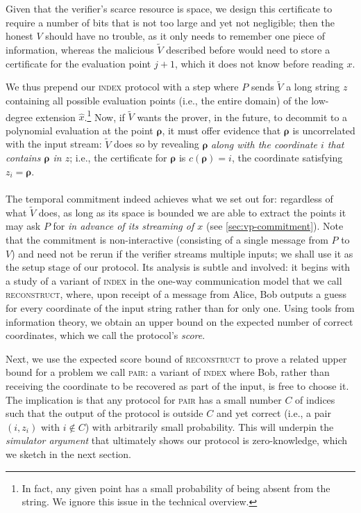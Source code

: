 \documentclass[a4paper,UKenglish,cleveref, autoref, thm-restate]{lipics-v2021}
\theoremstyle{definition}
\newcommand{\indexproblem}{\normalfont\textsc{index}\xspace}
\newcommand{\pair}{\normalfont\textsc{pair}\xspace}
\newcommand{\reconstruct}{\normalfont\textsc{reconstruct}\xspace}
\newcommand{\vcommitstring}{z}
\newcommand{\fingerprinttuple}{\bm{\rho}}
\begin{document}
    Given that the verifier's scarce resource is space, we design this certificate to require a number of bits that is not too large and yet not negligible; then the honest $V$ should have no trouble, as it only needs to remember one piece of information, whereas the malicious $\widetilde V$ described before would need to store a certificate for the evaluation point $j + 1$, which it does not know before reading $x$. 
    
    We thus prepend our \indexproblem protocol with a step where $P$ sends $\widetilde V$ a long string $\vcommitstring$ containing all possible evaluation points (i.e., the entire domain) of the low-degree extension $\hat x$.\footnote{In fact, any given point has a small probability of being absent from the string. We ignore this issue in the technical overview.} Now, if $\widetilde V$ wants the prover, in the future, to decommit to a polynomial evaluation at the point $\fingerprinttuple$, it must offer evidence that $\fingerprinttuple$ is uncorrelated with the input stream: $\widetilde V$ does so by revealing $\fingerprinttuple$ \emph{along with the coordinate $i$ that contains $\fingerprinttuple$ in $\vcommitstring$}; i.e., the certificate for $\fingerprinttuple$ is $c(\fingerprinttuple) = i$, the coordinate satisfying $\vcommitstring_i = \fingerprinttuple$.
    
    \iflipics\else\paragraph*{}\fi The temporal commitment indeed achieves what we set out for: regardless of what $\widetilde V$ does, as long as its space is bounded we are able to extract the points it may ask $P$ for \emph{in advance of its streaming of $x$} (see \cref{sec:vp-commitment}). Note that the commitment is non-interactive (consisting of a single message from $P$ to $V$) and need not be rerun if the verifier streams multiple inputs; we shall use it as the setup stage of our protocol. Its analysis is subtle and involved: it begins with a study of a variant of \indexproblem in the one-way communication model that we call \reconstruct, where, upon receipt of a message from Alice, Bob outputs a guess for every coordinate of the input string rather than for only one. Using tools from information theory, we obtain an upper bound on the expected number of correct coordinates, which we call the protocol's \emph{score}.
    
    Next, we use the expected score bound of \reconstruct to prove a related upper bound for a problem we call \pair: a variant of \indexproblem where Bob, rather than receiving the coordinate to be recovered as part of the input, is free to choose it. The implication is that any protocol for \pair has a small number $C$ of indices such that the output of the protocol is outside $C$ and yet correct (i.e., a pair $(i, \vcommitstring_i)$ with $i \notin C$) with arbitrarily small probability. This will underpin the \emph{simulator argument} that ultimately shows our protocol is zero-knowledge, which we sketch in the next section.
\end{document}
